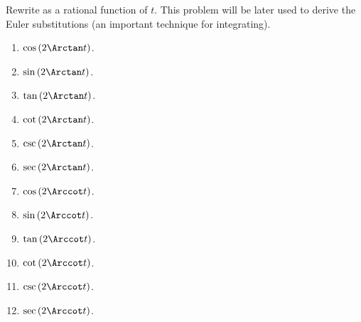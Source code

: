 Rewrite as a rational function of $t$. This problem will be later used to derive the Euler substitutions (an important technique for integrating).

\begin{multicols}{2}
\begin{enumerate}[ref={\fcProblemRef}]
\item \label{problemcos(2arctan t)} $\cos \left(2\Arctan t\right)$.
\item $\sin \left(2\Arctan t\right)$.
\item $\tan \left(2\Arctan t\right)$.
\item \label{problemcot(2arctan t)}  $\cot \left(2\Arctan t\right)$.
\item $\csc \left(2\Arctan t\right)$.
\item $\sec \left(2\Arctan t\right)$.
\item $\cos \left(2\Arccot t\right)$.
\item $\sin \left(2\Arccot t\right)$.
\item $\tan \left(2\Arccot t\right)$.
\item $\cot \left(2\Arccot t\right)$.
\item $\csc \left(2\Arccot t\right)$.

\item $\sec \left(2\Arccot t\right)$.
\end{enumerate}
\end{multicols}